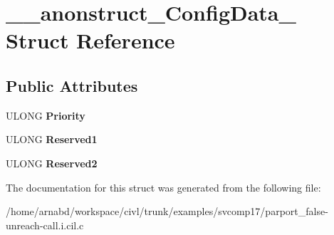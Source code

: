 \hypertarget{struct____anonstruct__ConfigData__34}{}\section{\+\_\+\+\_\+anonstruct\+\_\+\+Config\+Data\+\_ Struct Reference}
\label{struct____anonstruct__ConfigData__34}
\subsection*{Public Attributes}
\begin{DoxyCompactItemize}
\item 
\hypertarget{struct____anonstruct__ConfigData__34_aade67926e1ca5a126467c9e84b388cd7}{}U\+L\+O\+N\+G {\bfseries Priority}\label{struct____anonstruct__ConfigData__34_aade67926e1ca5a126467c9e84b388cd7}

\item 
\hypertarget{struct____anonstruct__ConfigData__34_ae4ae02d89bd122c9b11268a2e4e46b68}{}U\+L\+O\+N\+G {\bfseries Reserved1}\label{struct____anonstruct__ConfigData__34_ae4ae02d89bd122c9b11268a2e4e46b68}

\item 
\hypertarget{struct____anonstruct__ConfigData__34_ae2407fe2c6fb1e988b5918e9360760e3}{}U\+L\+O\+N\+G {\bfseries Reserved2}\label{struct____anonstruct__ConfigData__34_ae2407fe2c6fb1e988b5918e9360760e3}

\end{DoxyCompactItemize}


The documentation for this struct was generated from the following file\+:\begin{DoxyCompactItemize}
\item 
/home/arnabd/workspace/civl/trunk/examples/svcomp17/parport\+\_\+false-\/unreach-\/call.\+i.\+cil.\+c\end{DoxyCompactItemize}
